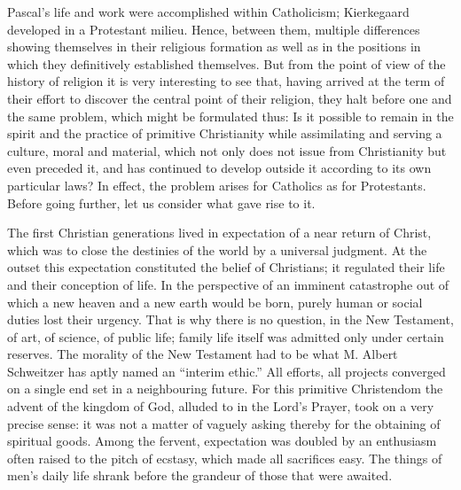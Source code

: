 \documentclass[12pt,a4paper]{article}
\newcommand{\opage}[1]{\marginnote{\footnotesize\textit{[#1]}}}
\begin{document}
Pascal's life and work were accomplished within Catholicism; Kierkegaard
developed in a Protestant milieu. Hence, between them, multiple differences
showing themselves in their religious formation as well as in the positions in
which they definitively established themselves. But from the point of view of
the history of religion it is very interesting to see that, having arrived at
the term of their effort to discover the central point of their religion, they
halt before one and the same problem, which might be formulated thus: Is it
possible to remain in the spirit and the practice of primitive Christianity
while assimilating and serving a culture, moral and material, which not only
does not issue from Christianity but even preceded it, and has continued to
develop outside it according to its own particular laws?
In effect, the problem arises for Catholics as for Protestants. Before going
further, let us consider what gave rise to it.

The first Christian generations lived in expectation of a near return of Christ,
which was to close the destinies of the world by a universal judgment. At the
outset this expectation constituted the belief of Christians; it regulated their
life and their \opage{236}conception
of life. In the perspective of an imminent catastrophe out of which a new heaven
and a new earth would be born, purely human or social duties lost their urgency.
That is why there is no question, in the New Testament, of art, of science, of
public life; family life itself was admitted only under certain reserves. The
morality of the New Testament had to be what M. Albert Schweitzer has aptly
named an ``interim ethic.'' All efforts, all projects converged on a single end
set in a neighbouring future. For this primitive Christendom the advent of the
kingdom of God, alluded to in the Lord's Prayer, took on a very precise sense:
it was not a matter of vaguely asking thereby for the obtaining of spiritual
goods. Among the fervent, expectation was doubled by an enthusiasm often raised
to the pitch of ecstasy, which made all sacrifices easy. The things of men's
daily life shrank before the grandeur of those that were awaited.
\end{document}
